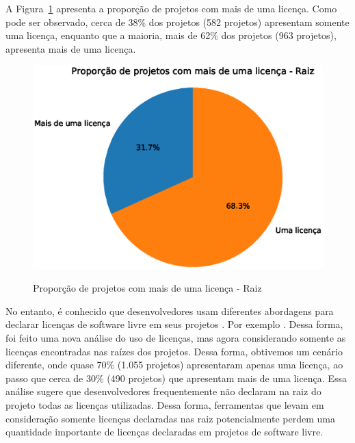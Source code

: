 A Figura~\ref{local-licencas-raiz} apresenta a proporção de projetos com mais de uma licença. Como pode ser observado, cerca de 38\% dos projetos (582 projetos) apresentam somente uma licença, enquanto que a maioria, mais de 62\% dos projetos (963 projetos), apresenta mais de uma licença. 


\begin{figure}[H]
    \centering
    \caption{Proporção de projetos com mais de uma licença - Raiz}
    \includegraphics[scale=0.8]{figuras/resultados/pizza_lic_raiz.eps}
    \label{local-licencas-raiz}
\end{figure}

No entanto, é conhecido que desenvolvedores usam diferentes abordagens para declarar licenças de software livre em seus projetos . Por exemplo . Dessa forma, foi feito uma nova análise do uso de licenças, mas agora considerando somente as licenças encontradas nas raízes dos projetos. 
Dessa forma, obtivemos um cenário diferente, onde quase 70\% (1.055 projetos) apresentaram apenas uma licença, ao passo que cerca de 30\% (490 projetos) que apresentam mais de uma licença. Essa análise sugere que desenvolvedores frequentemente não declaram na raiz do projeto todas as licenças utilizadas. Dessa forma, ferramentas que levam em consideração somente licenças declaradas nas raiz potencialmente perdem uma quantidade importante de licenças declaradas em projetos de software livre.


